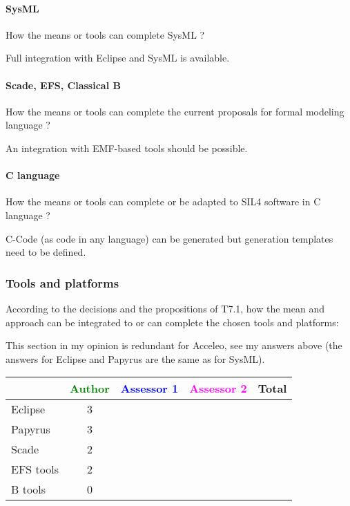 \paragraph{SysML}
How the means or tools can complete SysML ?

\begin{author_comment}
Full integration with Eclipse and SysML is available.
\end{author_comment}


\paragraph{Scade, EFS, Classical B}
How the means or tools can complete the current proposals for formal modeling language ?

\begin{author_comment}
An integration with EMF-based tools should be possible.
\end{author_comment}

\paragraph{C language}
How the means or tools can complete or be adapted to SIL4 software in C language ?

\begin{author_comment}
C-Code (as code in any language) can be generated but generation templates need to be defined.
\end{author_comment}

\subsubsection{Tools and platforms}

According to the decisions and the propositions of T7.1, how the mean and approach can be integrated to or can complete the chosen tools and platforms:

\begin{author_comment}
This section in my opinion is redundant for Acceleo, see my answers above (the answers for Eclipse and Papyrus are the same as for SysML).
\end{author_comment}

\begin{tabular}{|l | c | c | c | c|}
\hline
& \textcolor{green}{Author} & \textcolor{blue}{Assessor 1} & \textcolor{magenta}{Assessor 2} & Total \\
\hline 
Eclipse & 3& & &  \\
\hline
Papyrus  & 3& & & \\
\hline
Scade & 2& & & \\
\hline
EFS tools & 2& & & \\
\hline
B tools &0 & & & \\
\hline
\end{tabular}


